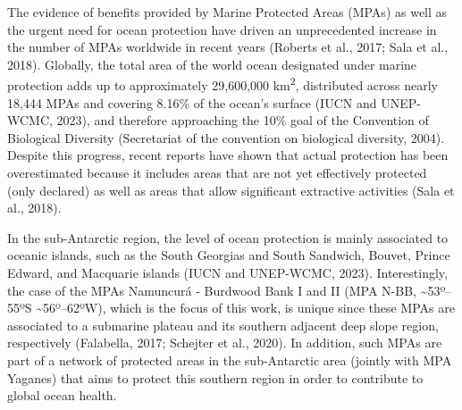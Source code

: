 \documentclass[preprint, 3p,
authoryear]{elsarticle} %
\begin{document}
The evidence of benefits provided by Marine Protected Areas (MPAs) as
well as the urgent need for ocean protection have driven an
unprecedented increase in the number of MPAs worldwide in recent years
(Roberts et al., 2017; Sala et al., 2018). Globally, the total area of
the world ocean designated under marine protection adds up to
approximately 29,600,000 km\textsuperscript{2}, distributed across
nearly 18,444 MPAs and covering 8.16\% of the ocean's surface (IUCN and
UNEP-WCMC, 2023), and therefore approaching the 10\% goal of the
Convention of Biological Diversity (Secretariat of the convention on
biological diversity, 2004). Despite this progress, recent reports have
shown that actual protection has been overestimated because it includes
areas that are not yet effectively protected (only declared) as well as
areas that allow significant extractive activities (Sala et al., 2018).

In the sub-Antarctic region, the level of ocean protection is mainly
associated to oceanic islands, such as the South Georgias and South
Sandwich, Bouvet, Prince Edward, and Macquarie islands (IUCN and
UNEP-WCMC, 2023). Interestingly, the case of the MPAs Namuncurá -
Burdwood Bank I and II (MPA N-BB, \textasciitilde53º--55ºS
\textasciitilde56º--62ºW), which is the focus of this work, is unique
since these MPAs are associated to a submarine plateau and its southern
adjacent deep slope region, respectively (Falabella, 2017; Schejter et
al., 2020). In addition, such MPAs are part of a network of protected
areas in the sub-Antarctic area (jointly with MPA Yaganes) that aims to
protect this southern region in order to contribute to global ocean
health.
\end{document}
